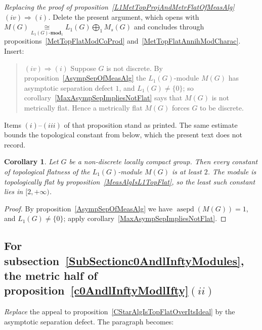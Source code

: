\documentclass[11pt]{article}
\theoremstyle{plain}
\newtheorem{corollary}[theorem]{Corollary}
\theoremstyle{definition}
\newcommand{\isom}[1]{\mathrel{\mathop{\cong}\limits_{#1}}}
\DeclareMathOperator{\asepd}{asepd}
\begin{document}
\emph{Replacing the proof of
proposition~\ref{L1MetTopProjAndMetrFlatOfMeasAlg}$(iv)\Rightarrow(i)$.} Delete
the present argument, which opens with
$M(G)\isom{L_1(G)\text{-}\mathbf{mod}_1}L_1(G)\bigoplus_1 M_s(G)$ and concludes
through propositions~\ref{MetTopFlatModCoProd} and~\ref{MetTopFlatAnnihModCharac}.
Insert:

\begin{quote}
$(iv)\Rightarrow(i)$ Suppose $G$ is not discrete. By
proposition~\ref{AsympSepOfMeasAlg} the $L_1(G)$-module $M(G)$ has asymptotic
separation defect $1$, and $L_1(G)\neq \{0 \}$; so
corollary~\ref{MaxAsympSepImpliesNotFlat} says that $M(G)$ is not metrically
flat. Hence a metrically flat $M(G)$ forces $G$ to be discrete.
\end{quote}

Items $(i)$--$(iii)$ of that proposition stand as printed. The same estimate
bounds the topological constant from below, which the present text does not
record.

\begin{corollary}\label{MeasAlgL1TopFlatConst}
Let $G$ be a non-discrete locally compact group. Then every constant of
topological flatness of the $L_1(G)$-module $M(G)$ is at least $2$. The module is
topologically flat by proposition~\ref{MeasAlgIsL1TopFlat}, so the least such
constant lies in $[2,+\infty)$.
\end{corollary}

\begin{proof}
By proposition~\ref{AsympSepOfMeasAlg} we have $\asepd(M(G))=1$, and
$L_1(G)\neq \{0 \}$; apply corollary~\ref{MaxAsympSepImpliesNotFlat}.
\end{proof}

\subsection{For subsection~\ref{SubSectionc0AndlInftyModules}, the metric half of
proposition~\ref{c0AndlInftyModlIfty}$(ii)$}

\emph{Replace} the appeal to proposition~\ref{CStarAlgIsTopFlatOverItsIdeal} by
the asymptotic separation defect. The paragraph becomes:
\end{document}
